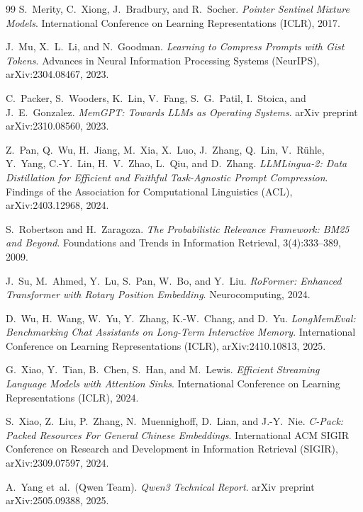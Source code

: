 \documentclass[11pt]{article}
\renewcommand{\_}{\origunderscore\allowbreak}
\begin{document}
\begin{thebibliography}{99}
S.~Merity, C.~Xiong, J.~Bradbury, and R.~Socher.
\newblock \textit{Pointer Sentinel Mixture Models}.
\newblock International Conference on Learning Representations (ICLR), 2017.

J.~Mu, X.~L.~Li, and N.~Goodman.
\newblock \textit{Learning to Compress Prompts with Gist Tokens}.
\newblock Advances in Neural Information Processing Systems (NeurIPS), arXiv:2304.08467, 2023.

C.~Packer, S.~Wooders, K.~Lin, V.~Fang, S.~G.~Patil, I.~Stoica, and J.~E.~Gonzalez.
\newblock \textit{MemGPT: Towards LLMs as Operating Systems}.
\newblock arXiv preprint arXiv:2310.08560, 2023.

Z.~Pan, Q.~Wu, H.~Jiang, M.~Xia, X.~Luo, J.~Zhang, Q.~Lin, V.~R{\"u}hle, Y.~Yang, C.-Y.~Lin, H.~V.~Zhao, L.~Qiu, and D.~Zhang.
\newblock \textit{LLMLingua-2: Data Distillation for Efficient and Faithful Task-Agnostic Prompt Compression}.
\newblock Findings of the Association for Computational Linguistics (ACL), arXiv:2403.12968, 2024.

S.~Robertson and H.~Zaragoza.
\newblock \textit{The Probabilistic Relevance Framework: BM25 and Beyond}.
\newblock Foundations and Trends in Information Retrieval, 3(4):333--389, 2009.

J.~Su, M.~Ahmed, Y.~Lu, S.~Pan, W.~Bo, and Y.~Liu.
\newblock \textit{RoFormer: Enhanced Transformer with Rotary Position Embedding}.
\newblock Neurocomputing, 2024.

D.~Wu, H.~Wang, W.~Yu, Y.~Zhang, K.-W.~Chang, and D.~Yu.
\newblock \textit{LongMemEval: Benchmarking Chat Assistants on Long-Term Interactive Memory}.
\newblock International Conference on Learning Representations (ICLR), arXiv:2410.10813, 2025.

G.~Xiao, Y.~Tian, B.~Chen, S.~Han, and M.~Lewis.
\newblock \textit{Efficient Streaming Language Models with Attention Sinks}.
\newblock International Conference on Learning Representations (ICLR), 2024.

S.~Xiao, Z.~Liu, P.~Zhang, N.~Muennighoff, D.~Lian, and J.-Y.~Nie.
\newblock \textit{C-Pack: Packed Resources For General Chinese Embeddings}.
\newblock International ACM SIGIR Conference on Research and Development in Information Retrieval (SIGIR), arXiv:2309.07597, 2024.

A.~Yang et~al.\ (Qwen Team).
\newblock \textit{Qwen3 Technical Report}.
\newblock arXiv preprint arXiv:2505.09388, 2025.


\end{thebibliography}
\end{document}
